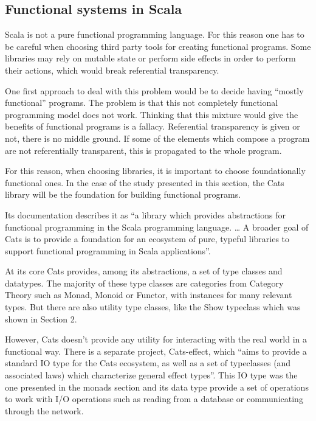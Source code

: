 \documentclass[../main.tex]{subfiles}
\begin{document}
\subsection{Functional systems in Scala}
Scala is not a pure functional programming language. For this reason one has to
be careful when choosing third party tools for creating functional programs.
Some libraries may rely on mutable state or perform side effects in order to
perform their actions, which would break referential transparency.

One first approach to deal with this problem would be to decide having ``mostly
functional'' programs. The problem is that this not completely functional
programming model does not work\autocite{Meijer2014TheWork}. Thinking that
this mixture would give the benefits of functional programs is a
fallacy. Referential transparency is given or not, there is no middle ground. If
some of the elements which compose a program are not referentially transparent,
this is propagated to the whole program.

For this reason, when choosing libraries, it is important to choose foundationally
functional ones. In the case of the study presented in this section, the Cats library
\autocite{Cats:Home} will be the foundation for building functional programs.

Its documentation describes it as ``a library which provides abstractions for
functional programming in the Scala programming language. \ldots \: A broader goal of
Cats is to provide a foundation for an ecosystem of pure, typeful libraries to
support functional programming in Scala applications''.

At its core Cats provides, among its abstractions, a set of type classes and
datatypes. The majority of these type classes are categories from Category Theory
such as Monad, Monoid or Functor, with instances for many relevant types. But
there are also utility type classes, like the Show typeclass which was shown in
Section 2.

However, Cats doesn't provide any utility for interacting with the real world in
a functional way. There is a separate project, Cats-effect, \autocite{CatsHome}
which ``aims to
provide a standard IO type for the Cats ecosystem, as well as a set
of typeclasses (and associated laws) which characterize general effect types''.
This IO type was the one presented in the monads section and its data type
provide a set of operations to work with I/O operations such as reading from a
database or communicating through the network.
\end{document}
